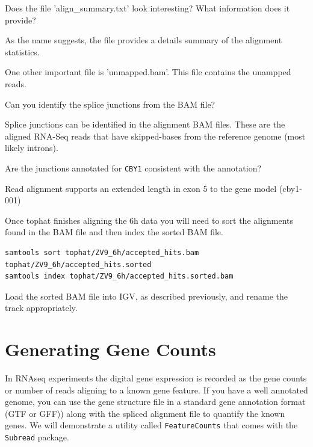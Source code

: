 \begin{questions}

Does the file 'align\_summary.txt' look interesting? What information does it provide?
\begin{answer}
As the name suggests, the file provides a details summary of the alignment statistics. 
\end{answer}
One other important file is 'unmapped.bam'. This file contains the unampped reads.

Can you identify the splice junctions from the BAM file?
\begin{answer}
Splice junctions can be identified in the alignment BAM files.
These are the aligned RNA-Seq reads that have skipped-bases from the reference genome (most likely introns).
\end{answer}

Are the junctions annotated for \texttt{CBY1} consistent with the annotation?
\begin{answer}
Read alignment supports an extended length in exon 5 to the gene model (cby1-001) 
\end{answer}


\end{questions}

\begin{steps}
Once tophat finishes aligning the 6h data you will need to sort the alignments found in the BAM file and then index the
sorted BAM file.

\begin{lstlisting}
samtools sort tophat/ZV9_6h/accepted_hits.bam tophat/ZV9_6h/accepted_hits.sorted
samtools index tophat/ZV9_6h/accepted_hits.sorted.bam
\end{lstlisting}

Load the sorted BAM file into IGV, as described previously, and rename the track appropriately.
\end{steps}

\section{Generating Gene Counts}

In RNAseq experiments the digital gene expression is recorded as the gene counts or number of reads aligning to a known gene feature. If you have a well annotated genome, you can use the gene structure file in a standard gene annotation format (GTF or GFF)) along with the spliced alignment file to quantify the known genes. We will demonstrate a utility called \texttt{FeatureCounts} that comes with the \texttt{Subread} package. 

